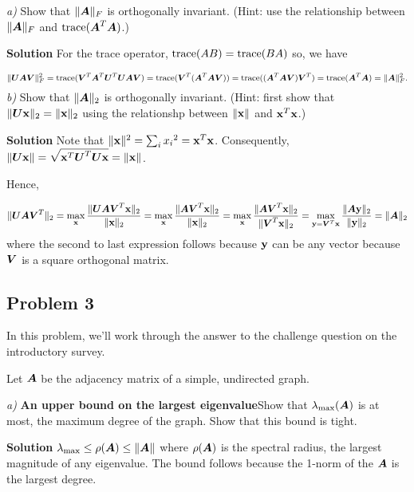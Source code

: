 \documentclass{article}
\begin{document}
\emph{a)} Show that $\normof{ \mA }_F$ is orthogonally invariant. (Hint: use the relationship between $\normof{ \mA }_F$ and $\text{trace}( \mA^T \mA )$.)

\textbf{Solution} For the trace operator, $\trace(AB)=\trace(BA)$ so, we have

\begin{displaymath}
\normof{\mU \mA \mV}_F^2  = \trace(\mV^T \mA^T \mU^T \mU \mA \mV) = \trace(\mV^T (\mA^T \mA \mV)) = \trace((\mA^T \mA \mV) \mV^T) = \trace(\mA^T \mA) = \normof{\mA}_F^2.
\end{displaymath}
\emph{b)} Show that $\normof{ \mA }_2$ is orthogonally invariant. (Hint: first show that $\normof{ \mU \vx }_2 = \normof{\vx}_2$ using the relationshp between $\normof{ \vx }$ and $\vx^T \vx$.)

\textbf{Solution} Note that $\normof{\vx}^2 = \sum_i {x_i}^2 = \vx^T \vx$. Consequently, $\normof{\mU \vx} = \sqrt{\vx^T \mU^T \mU \vx} = \normof{\vx}$.

Hence,

\begin{displaymath}
\normof{\mU \mA \mV^T}_2 = \max_{\vx} \frac{\normof{\mU \mA \mV^T \vx}_2}{\normof{\vx}_2} = 
\max_{\vx} \frac{\normof{\mA \mV^T \vx}_2}{\normof{\vx}_2} = 
\max_{\vx} \frac{\normof{\mA \mV^T \vx}_2}{\normof{\mV^T \vx}_2} = 
\max_{\vy=\mV^T\vx} \frac{\normof{\mA \vy}_2}{\normof{\vy}_2} = \normof{\mA}_2
\end{displaymath}
where the second to last expression follows because $\vy$ can be any vector because $\mV$ is a square orthogonal matrix.

\hypertarget{problem_3_5}{}\subsection*{{Problem 3}}\label{problem_3_5}

In this problem, we'{}ll work through the answer to the challenge question on the introductory survey.

Let $\mA$ be the adjacency matrix of a simple, undirected graph.

\emph{a)} \textbf{An upper bound on the largest eigenvalue}\newline Show that $\lambda_{\max}(\mA)$ is at most, the maximum degree of the graph. Show that this bound is tight.

\textbf{Solution} $\lambda_{\max} \le \rho(\mA) \le \normof{\mA}$ where $\rho(\mA)$ is the spectral radius, the largest magnitude of any eigenvalue. The bound follows because the 1-norm of the $\mA$ is the largest degree.
\end{document}
